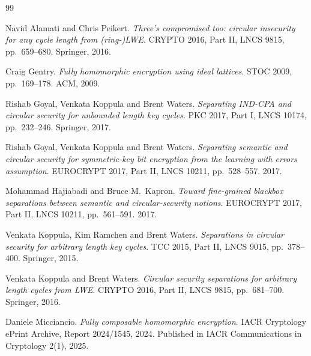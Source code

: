 \documentclass{conjura-conjecture}
\begin{document}
\begin{conjurabibliography}{99}

Navid Alamati and Chris Peikert.
\emph{Three's compromised too: circular insecurity for any cycle length
from (ring-)LWE}.
CRYPTO 2016, Part II, LNCS 9815, pp.\ 659--680. Springer, 2016.

Craig Gentry.
\emph{Fully homomorphic encryption using ideal lattices}.
STOC 2009, pp.\ 169--178. ACM, 2009.

Rishab Goyal, Venkata Koppula and Brent Waters.
\emph{Separating IND-CPA and circular security for unbounded length key
cycles}.
PKC 2017, Part I, LNCS 10174, pp.\ 232--246. Springer, 2017.

Rishab Goyal, Venkata Koppula and Brent Waters.
\emph{Separating semantic and circular security for symmetric-key bit
encryption from the learning with errors assumption}.
EUROCRYPT 2017, Part II, LNCS 10211, pp.\ 528--557. 2017.

Mohammad Hajiabadi and Bruce M.\ Kapron.
\emph{Toward fine-grained blackbox separations between semantic and
circular-security notions}.
EUROCRYPT 2017, Part II, LNCS 10211, pp.\ 561--591. 2017.

Venkata Koppula, Kim Ramchen and Brent Waters.
\emph{Separations in circular security for arbitrary length key
cycles}.
TCC 2015, Part II, LNCS 9015, pp.\ 378--400. Springer, 2015.

Venkata Koppula and Brent Waters.
\emph{Circular security separations for arbitrary length cycles from
LWE}.
CRYPTO 2016, Part II, LNCS 9815, pp.\ 681--700. Springer, 2016.

Daniele Micciancio.
\emph{Fully composable homomorphic encryption}.
IACR Cryptology ePrint Archive, Report 2024/1545, 2024. Published in
IACR Communications in Cryptology 2(1), 2025.

\end{conjurabibliography}
\end{document}
